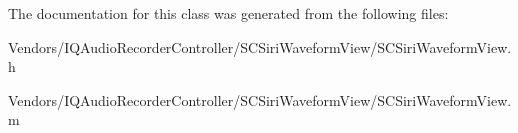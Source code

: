 The documentation for this class was generated from the following files\+:\begin{DoxyCompactItemize}
\item 
Vendors/\+I\+Q\+Audio\+Recorder\+Controller/\+S\+C\+Siri\+Waveform\+View/S\+C\+Siri\+Waveform\+View.\+h\item 
Vendors/\+I\+Q\+Audio\+Recorder\+Controller/\+S\+C\+Siri\+Waveform\+View/S\+C\+Siri\+Waveform\+View.\+m\end{DoxyCompactItemize}
